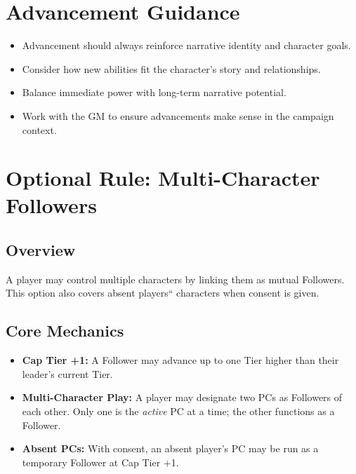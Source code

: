 \section{Advancement Guidance}\label{sec:advancement_guidance}

\begin{itemize}
    \item Advancement should always reinforce narrative identity and character goals.
    \item Consider how new abilities fit the character's story and relationships.
    \item Balance immediate power with long-term narrative potential.
    \item Work with the GM to ensure advancements make sense in the campaign context.
\end{itemize}

\section{Optional Rule: Multi-Character Followers}\label{sec:multi_character_followers}

\subsection{Overview}
A player may control multiple characters by linking them as mutual Followers. This option also covers absent players`` characters when consent is given.

\subsection{Core Mechanics}
\begin{itemize}
    \item \textbf{Cap Tier +1:} A Follower may advance up to one Tier higher than their leader's current Tier.
    \item \textbf{Multi-Character Play:} A player may designate two PCs as Followers of each other. Only one is the \emph{active} PC at a time; the other functions as a Follower.
    \item \textbf{Absent PCs:} With consent, an absent player's PC may be run as a temporary Follower at Cap Tier +1.
\end{itemize}

